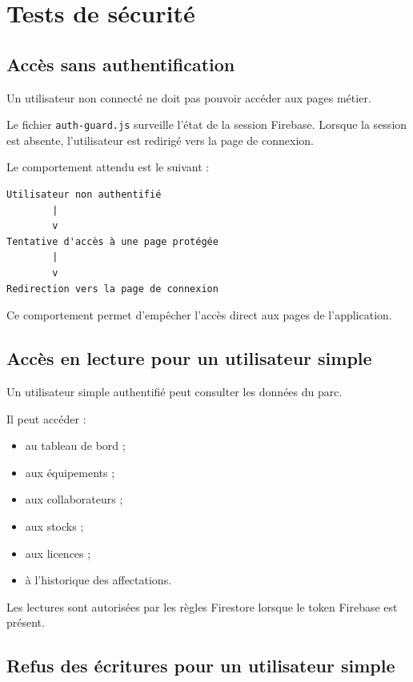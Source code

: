 \documentclass{rapportENSIAS}
\begin{document}
\section{Tests de sécurité}

\subsection{Accès sans authentification}

Un utilisateur non connecté ne doit pas pouvoir accéder aux pages métier.

Le fichier \texttt{auth-guard.js} surveille l’état de la session Firebase. Lorsque la session est absente, l’utilisateur est redirigé vers la page de connexion.

Le comportement attendu est le suivant :

\begin{verbatim}
Utilisateur non authentifié
        |
        v
Tentative d'accès à une page protégée
        |
        v
Redirection vers la page de connexion
\end{verbatim}

Ce comportement permet d’empêcher l’accès direct aux pages de l’application.

\subsection{Accès en lecture pour un utilisateur simple}

Un utilisateur simple authentifié peut consulter les données du parc.

Il peut accéder :

\begin{itemize}
    \item au tableau de bord ;
    \item aux équipements ;
    \item aux collaborateurs ;
    \item aux stocks ;
    \item aux licences ;
    \item à l’historique des affectations.
\end{itemize}

Les lectures sont autorisées par les règles Firestore lorsque le token Firebase est présent.

\subsection{Refus des écritures pour un utilisateur simple}
\end{document}
